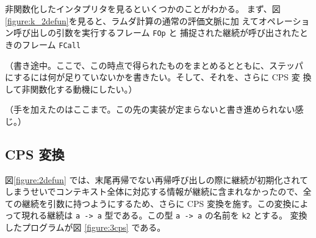 非関数化したインタプリタを見るといくつかのことがわかる。
まず、図 \ref{figure:k_2defun}を見ると、ラムダ計算の通常の評価文脈に加
えてオペレーション呼び出しの引数を実行するフレーム \texttt{FOp} と
捕捉された継続が呼び出されたときのフレーム \texttt{FCall}

（書き途中。ここで、この時点で得られたものをまとめるとともに、ステッパ
にするには何が足りていないかを書きたい。そして、それを、さらに CPS 変
換して非関数化する動機にしたい。）

（手を加えたのはここまで。この先の実装が定まらないと書き進められない感
じ。）


\subsection{CPS 変換}
\label{subsection:3cps}

図\ref{figure:2defun} では、末尾再帰でない再帰呼び出しの際に継続が初期化されてしまうせいでコンテキスト全体に対応する情報が継続に含まれなかったので、全ての継続を引数に持つようにするため、さらに CPS 変換を施す。この変換によって現れる継続は \texttt{a -> a} 型である。この型 \texttt{a -> a} の名前を \texttt{k2} とする。
変換したプログラムが図 \ref{figure:3cps} である。

